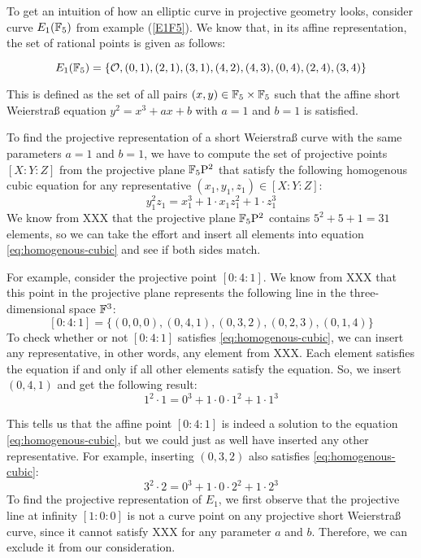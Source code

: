 \begin{example} To get an intuition of how an elliptic curve in projective geometry looks, consider curve $E_1(\mathbb{F}_5)$ from example (\ref{E1F5}). We know that, in its affine representation, the set of rational points is given as follows:

\begin{equation}\label{eq:E1F5-affine}
E_1(\mathbb{F}_5) = \{\mathcal{O}, (0,1),(2,1),(3,1),(4,2),(4,3),(0,4),(2,4),(3,4)\}
\end{equation}

This is defined as the set of all pairs $(x,y)\in \mathbb{F}_5\times \mathbb{F}_5$ such that the affine short Weierstraß equation $y^2 = x^3 + ax +b$ with $a=1$ and $b=1$ is satisfied.

To find the projective representation of a short Weierstraß curve with the same parameters $a=1$ and $b=1$, we have to compute the set of projective points $[X:Y:Z]$ from the projective plane $\mathbb{F}_5\mathrm{P}^2$ that satisfy the following homogenous cubic equation for any representative $(x_1,y_1,z_1)\in [X:Y:Z]$:
\begin{equation}\label{eq:homogenous-cubic}
y_1^2z_1 = x_1^3 + 1\cdot x_1 z_1^2 + 1\cdot z_1^3
\end{equation}
 We know from XXX that the projective plane $\mathbb{F}_5\mathrm{P}^2$ contains $5^2+5+1= 31$ elements, so we can take the effort and insert all elements into equation \ref{eq:homogenous-cubic} and see if both sides match.

For example, consider the projective point $[0:4:1]$. We know from XXX that this point in the projective plane represents the following line in the three-dimensional space $\mathbb{F}^3$:
$$
[0:4:1] = \{(0,0,0),(0,4,1),(0,3,2),(0,2,3),(0,1,4)\}
$$  
To check whether or not $[0:4:1]$ satisfies \ref{eq:homogenous-cubic}, we can insert any representative, in other words, any element from XXX. Each element satisfies the equation if and only if all other elements satisfy the equation. So, we insert $(0,4,1)$ and get the following result:
$$
1^2\cdot 1 = 0^3 + 1\cdot 0\cdot 1^2 + 1\cdot 1^3
$$

This tells us that the affine point $[0:4:1]$ is indeed a solution to the equation \ref{eq:homogenous-cubic}, but we could just as well have inserted any other representative. For example, inserting $(0,3,2)$ also satisfies \ref{eq:homogenous-cubic}: 
$$
3^2\cdot 2 = 0^3 + 1\cdot 0\cdot 2^2 + 1\cdot 2^3
$$
To find the projective representation of $E_1$, we first observe that the projective line at infinity $[1:0:0]$ is not a curve point on any projective short Weierstraß curve, since it cannot satisfy XXX for any parameter $a$ and $b$. Therefore, we can exclude it from our consideration. 


\end{example}
